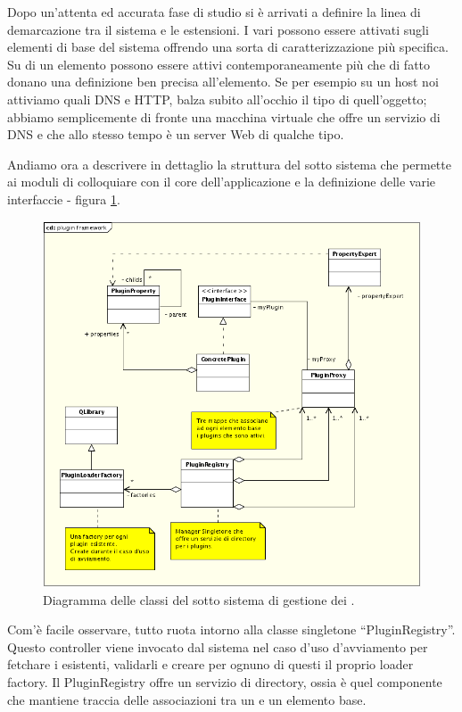 Dopo un'attenta ed accurata fase di studio si è arrivati a definire la linea di demarcazione tra il sistema e le estensioni. I vari \plugin{} possono essere attivati sugli elementi di base del sistema offrendo una sorta di caratterizzazione più specifica. Su di un elemento possono essere attivi contemporaneamente più \plugin{} che di fatto donano una definizione ben precisa all'elemento. Se per esempio su un host noi attiviamo \plugin{} quali DNS e HTTP, balza subito all'occhio il tipo di quell'oggetto; abbiamo semplicemente di fronte una macchina virtuale che offre un servizio di DNS e che allo stesso tempo è un server Web di qualche tipo.

Andiamo ora a descrivere in dettaglio la struttura del sotto sistema che permette ai moduli di colloquiare con il core dell'applicazione e la definizione delle varie interfaccie - figura \ref{figura:uml_plugin_framework}.

\begin{figure}[!htb]
	\centering
	\includegraphics[width=12cm]{images/plugin_framework_uml.png}
	\caption{Diagramma delle classi del sotto sistema di gestione dei \plugin{}.}
	\label{figura:uml_plugin_framework}
\end{figure}

Com'è facile osservare, tutto ruota intorno alla classe singletone ``PluginRegistry''. Questo controller viene invocato dal sistema nel caso d'uso d'avviamento per fetchare i \plugin{} esistenti, validarli e creare per ognuno di questi il proprio loader factory. Il PluginRegistry offre un servizio di directory, ossia è quel componente che mantiene traccia delle associazioni tra un \plugin{} e un elemento base.

